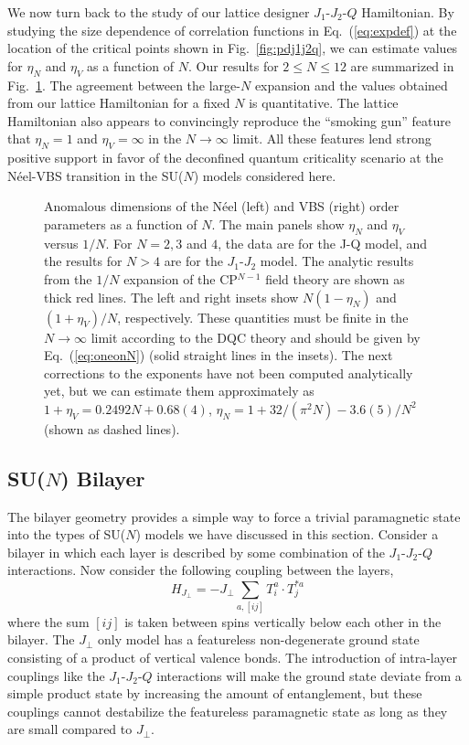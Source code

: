 \documentclass[range]{ar2e}
\begin{document}
We now turn back to the study of our lattice designer $J_1$-$J_2$-$Q$
Hamiltonian. By studying the size dependence of correlation functions in Eq.~(\ref{eq:expdef})
 at the location of the critical points shown in Fig.~\ref{fig:pdj1j2q}, we can
 estimate values for $\eta_N$ and $\eta_V$ as a function
 of $N$. Our results for $2\leq N \leq 12$ are summarized in Fig.~\ref{fig:exp}. The
 agreement between the large-$N$ expansion and the values obtained from our
 lattice Hamiltonian for a fixed $N$ is quantitative. The lattice
 Hamiltonian also appears to convincingly reproduce the ``smoking gun'' feature that
 $\eta_N=1$ and $\eta_V=\infty$ in the $N\rightarrow \infty$
 limit. All these features lend strong positive support in favor of
 the deconfined quantum criticality scenario at the N\'eel-VBS
 transition in the SU($N$) models considered here.



\begin{figure}
  \caption{ \label{fig:exp} Anomalous dimensions of the N\'eel (left)
    and VBS (right)
  order parameters as a function of $N$. The main panels show $\eta_N$ and $\eta_V$ versus $1/N$. For $N=2,3$ and $4$, the data are 
  for the J-Q model, and the results for $N>4$ are for the $J_1$-$J_2$ model. The analytic results 
  from the $1/N$ expansion of the CP$^{N-1}$ field theory are shown as thick red lines. The left and right insets 
  show $N(1-\eta_N)$ and $(1+\eta_V)/N$, respectively. These quantities must be finite in the  $N\rightarrow \infty$ 
  limit according to the DQC theory and should be given by Eq.~(\ref{eq:oneonN}) (solid straight lines in the insets). 
  The next corrections to the exponents have not been computed analytically yet, but we can estimate them approximately 
  as $1+\eta_V = 0.2492 N + 0.68(4)$, $\eta_N = 1+32/(\pi^2 N)-3.6(5)/N^2$ (shown as dashed lines).}
\end{figure}

\subsection{SU($N$) Bilayer}
\label{ss:bilN}

The bilayer geometry provides a simple way to force a trivial paramagnetic
state into the types of SU($N$) models we have discussed in this
section. Consider a bilayer in which each layer is described by some
combination of the $J_1$-$J_2$-$Q$ interactions. Now consider the
following coupling between the layers,
\begin{equation}
 H_{J_\perp} = -J_\perp \sum_{a,[ij]} T^a_i\cdot T^{*a}_j
\end{equation}
where the sum $[ij]$ is taken between spins vertically below each other
in the bilayer. The $J_\perp$ only model has a featureless non-degenerate ground state
consisting of a product of vertical valence bonds. The introduction of intra-layer couplings like the $J_1$-$J_2$-$Q$ interactions will
make the ground state deviate from a simple product state by
increasing the amount of entanglement, but these couplings
 cannot destabilize the featureless paramagnetic
state as long as they are small compared to $J_\perp$. 
\end{document}
